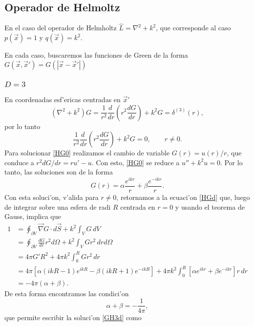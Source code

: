 \subsection{Operador de Helmoltz}
En el caso del operador de Helmholtz $\hat{L}=\nabla^2+k^2$, que corresponde al caso $p(\vec{x})=1$ y $q(\vec{x})=k^2$.

En cada caso, buscaremos las funciones de Green de la forma $G(\vec{x},\vec{x}')=G(|\vec{x}-\vec{x}'|)$

\subsubsection{$D=3$}
En coordenadas esf'ericas centradas en $\vec{x}'$
\begin{equation}\label{HGd}
(\nabla^2+k^2)G=\frac{1}{r^2}\frac{d\ }{dr}\left(r^2\frac{dG}{dr}\right)+k^2G=\delta^{(3)}(r),
\end{equation}
por lo tanto 
\begin{equation}\label{HG0}
\frac{1}{r^2}\frac{d\ }{dr}\left(r^2\frac{dG}{dr}\right)+k^2G=0, \qquad r\neq 0.
\end{equation}
Para solucionar \eqref{HG0} realizamos el cambio de variable $G(r)=u(r)/r$, que conduce a $r^2dG/dr=ru'-u$. Con esto, \eqref{HG0} se reduce a $u''+k^2u=0$. Por lo tanto, las soluciones son de la forma
\begin{equation}\label{GH3d}
G(r)=\alpha\frac{e^{ikr}}{r}+\beta\frac{e^{-ikr}}{r}.
\end{equation}
Con esta soluci'on, v'alida para $r\neq 0$, retornamos a la ecuaci'on \eqref{HGd} que, luego de integrar sobre una esfera de radi $R$ centrada en $r=0$ y usando el teorema de Gauss, implica que
\begin{align}
1 &= \oint_{\partial V}\vec\nabla G\cdot d\vec{S}+k^2\int_VG\,dV \\
&= \oint_{\partial V}\frac{dG}{dr}r^2d\Omega+k^2\int_VGr^2\,drd\Omega \\
&= 4\pi G'R^2+4\pi k^2\int_0^R Gr^2\,dr \\
&= 4\pi\left[\alpha\left(ikR-1\right)e^{ikR}-\beta\left(ikR+1\right)e^{-ikR}\right]+4\pi k^2\int_0^R \left[\alpha e^{ikr}+\beta e^{-ikr}\right]r\,dr \\
&= -4\pi(\alpha+\beta).
\end{align}
De esta forma encontramos las condici'on
\begin{equation}
\alpha+\beta=-\frac{1}{4\pi},
\end{equation}
que permite escribir la soluci'on \eqref{GH3d} como
